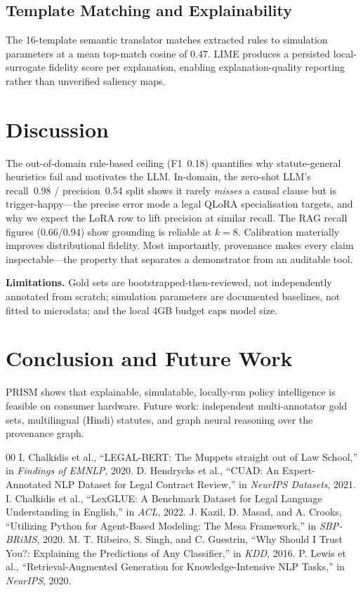 \documentclass[conference]{IEEEtran}
\begin{document}
\subsection{Template Matching and Explainability}
The 16-template semantic translator matches extracted rules to simulation
parameters at a mean top-match cosine of 0.47. LIME produces a persisted
local-surrogate fidelity score per explanation, enabling explanation-quality
reporting rather than unverified saliency maps.

\section{Discussion}
The out-of-domain rule-based ceiling (F1~0.18) quantifies why statute-general
heuristics fail and motivates the LLM. In-domain, the zero-shot LLM's
recall~0.98 / precision~0.54 split shows it rarely \emph{misses} a causal
clause but is trigger-happy---the precise error mode a legal QLoRA
specialisation targets, and why we expect the LoRA row to lift precision at
similar recall. The RAG recall figures (0.66/0.94) show grounding is reliable
at $k{=}8$. Calibration materially improves distributional fidelity. Most
importantly, provenance makes every claim inspectable---the property that
separates a demonstrator from an auditable tool.

\textbf{Limitations.} Gold sets are bootstrapped-then-reviewed, not
independently annotated from scratch; simulation parameters are documented
baselines, not fitted to microdata; and the local 4GB budget caps model size.

\section{Conclusion and Future Work}
PRISM shows that explainable, simulatable, locally-run policy intelligence is
feasible on consumer hardware. Future work: independent multi-annotator gold
sets, multilingual (Hindi) statutes, and graph neural reasoning over the
provenance graph.

\begin{thebibliography}{00}
 I. Chalkidis et al., ``LEGAL-BERT: The Muppets
straight out of Law School,'' in \emph{Findings of EMNLP}, 2020.
 D. Hendrycks et al., ``CUAD: An Expert-Annotated
NLP Dataset for Legal Contract Review,'' in \emph{NeurIPS Datasets}, 2021.
 I. Chalkidis et al., ``LexGLUE: A Benchmark
Dataset for Legal Language Understanding in English,'' in \emph{ACL}, 2022.
 J. Kazil, D. Masad, and A. Crooks, ``Utilizing Python
for Agent-Based Modeling: The Mesa Framework,'' in \emph{SBP-BRiMS}, 2020.
 M. T. Ribeiro, S. Singh, and C. Guestrin, ``Why
Should I Trust You?: Explaining the Predictions of Any Classifier,'' in
\emph{KDD}, 2016.
 P. Lewis et al., ``Retrieval-Augmented Generation for
Knowledge-Intensive NLP Tasks,'' in \emph{NeurIPS}, 2020.
\end{thebibliography}
\end{document}
